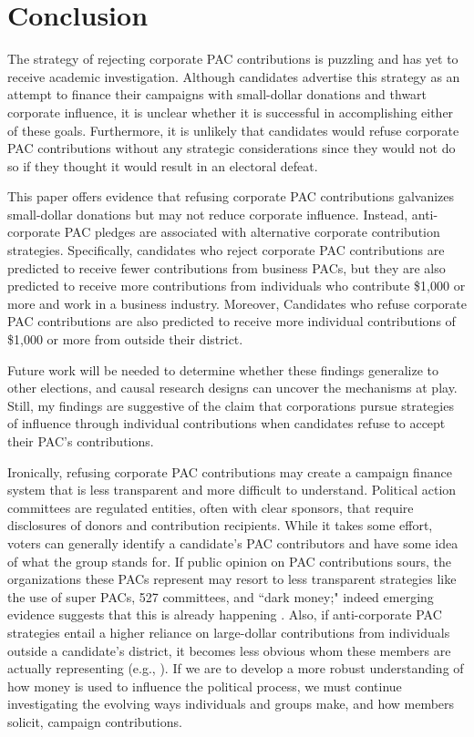 \documentclass[12pt]{article}
\begin{document}
\section{Conclusion} \label{sec: conclusion}

The strategy of rejecting corporate PAC contributions is puzzling and has yet to receive academic investigation. Although candidates advertise this strategy as an attempt to finance their campaigns with small-dollar donations and thwart corporate influence, it is unclear whether it is successful in accomplishing either of these goals. Furthermore, it is unlikely that candidates would refuse corporate PAC contributions without any strategic considerations since they would not do so if they thought it would result in an electoral defeat. 

This paper offers evidence that refusing corporate PAC contributions galvanizes small-dollar donations but may not reduce corporate influence. Instead, anti-corporate PAC pledges are associated with alternative corporate contribution strategies. Specifically, candidates who reject corporate PAC contributions are predicted to receive fewer contributions from business PACs, but they are also predicted to receive more contributions from individuals who contribute \$1,000 or more and work in a business industry. Moreover, Candidates who refuse corporate PAC contributions are also predicted to receive more individual contributions of \$1,000 or more from outside their district.   

Future work will be needed to determine whether these findings generalize to other elections, and causal research designs can uncover the mechanisms at play. Still, my findings are suggestive of the claim that corporations pursue strategies of influence through individual contributions when candidates refuse to accept their PAC's contributions. 

Ironically, refusing corporate PAC contributions may create a campaign finance system that is less transparent and more difficult to understand. Political action committees are regulated entities, often with clear sponsors, that require disclosures of donors and contribution recipients. While it takes some effort, voters can generally identify a candidate's PAC contributors and have some idea of what the group stands for. If public opinion on PAC contributions sours, the organizations these PACs represent may resort to less transparent strategies like the use of super PACs, 527 committees, and ``dark money;" indeed emerging evidence suggests that this is already happening \citep{opensecrets.org2019, massoglia2021}. Also, if anti-corporate PAC strategies entail a higher reliance on large-dollar contributions from individuals outside a candidate's district, it becomes less obvious whom these members are actually representing (e.g., \citet{baker2016}). If we are to develop a more robust understanding of how money is used to influence the political process, we must continue investigating the evolving ways individuals and groups make, and how members solicit, campaign contributions. 
\end{document}

